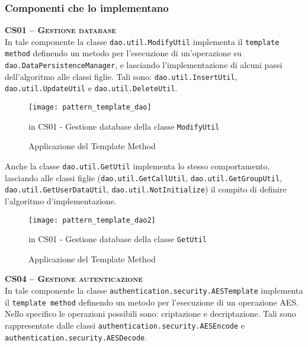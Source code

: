 \subsubsection{Componenti che lo implementano}

\begin{description}

  \item{\scshape\bfseries CS01 -- Gestione database}\\
In tale componente la classe \texttt{dao.util.ModifyUtil} implementa il  \texttt{template method} definendo un metodo per l'esecuzione di un'operazione su \texttt{dao.DataPersistenceManager}, e lasciando l'implementazione di alcuni passi dell'algoritmo alle classi figlie. Tali sono: \texttt{dao.util.InsertUtil}, \texttt{dao.util.UpdateUtil} e \texttt{dao.util.DeleteUtil}.


\begin{figure}[H]
  \centering
  \texttt{[image: pattern\_template\_dao]}
  \caption{Applicazione del  Template Method}in \textsf{CS01 - Gestione database} della classe \texttt{ModifyUtil}  \label{fig:template_dao}
\end{figure}




Anche la classe \texttt{dao.util.GetUtil} implementa lo stesso comportamento, lasciando alle classi figlie (\texttt{dao.util.GetCallUtil}, \texttt{dao.util.GetGroupUtil}, \texttt{dao.util.GetUserDataUtil}, \texttt{dao.util.NotInitialize}) il compito di definire l'algoritmo d'implementazione.

\begin{figure}[H]
  \centering
  \texttt{[image: pattern\_template\_dao2]}
  \caption{Applicazione del  Template Method}in \textsf{CS01 - Gestione database} della classe \texttt{GetUtil}  \label{fig:template_dao2}
\end{figure}



	\item{\scshape\bfseries CS04 -- Gestione autenticazione}\\
In tale componente la classe \texttt{authentication.security.AESTemplate} implementa il  \texttt{template method} definendo un metodo per l'esecuzione di un operazione AES. Nello specifico le operazioni possibili sono: criptazione e decriptazione. Tali sono rappresentate dalle classi \texttt{authentication.security.AESEncode} e \texttt{authentication.security.AESDecode}.


\end{description}
